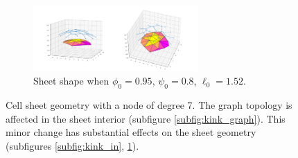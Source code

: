 \begin{figure}[htbp]
\begin{subfigure}[b]{\textwidth}
        \includegraphics[width=0.69\textwidth]{kink/kink0.95_0.8_1.52_10_plot.png}
        \caption{Sheet shape when $\phi_0=0.95$, $\psi_0=0.8$, $\ell_0=1.52$.}
        \label{subfig:kink_out}
    \end{subfigure}
    \caption{Cell sheet geometry with a node of degree 7. The graph topology is affected in the sheet interior (subfigure \ref{subfig:kink_graph}). This minor change has substantial effects on the sheet geometry (subfigures \ref{subfig:kink_in}, \ref{subfig:kink_out}).}
    \label{fig:kink}
\end{figure}

